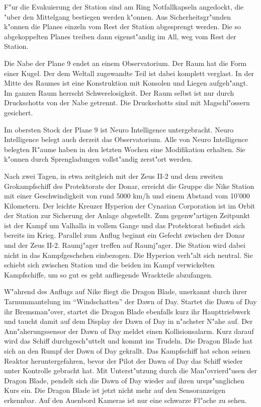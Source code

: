 F"ur die Evakuierung der Station sind am Ring Notfallkapseln angedockt, die "uber den Mittelgang bestiegen werden k"onnen. Aus Sicherheitsgr"unden k"onnen die Planes einzeln vom Rest der Station abgesprengt werden. Die so abgekoppelten Planes treiben dann eigenst"andig im All, weg vom Rest der Station. 

Die Nabe der Plane 9 endet an einem Observatorium. Der Raum hat die Form einer Kugel. Der dem Weltall zugewandte Teil ist dabei komplett verglast. In der Mitte des Raumes ist eine Konstruktion mit Konsolen und Liegen aufgeh"angt. Im ganzen Raum herrscht Schwerelosigkeit. Der Raum selbst ist nur durch Druckschotts von der Nabe getrennt. Die Druckschotts sind mit Magschl"ossern gesichert. 

Im obersten Stock der Plane 9 ist Neuro Intelligence untergebracht. Neuro Intelligence belegt auch derzeit das Observatorium. Alle von Neuro Intelligence belegten R"aume haben in den letzten Wochen eine Modifikation erhalten. Sie k"onnen durch Sprengladungen vollst"andig zerst"ort werden.



Nach zwei Tagen, in etwa zeitgleich mit der Zeus II-2 und dem zweiten Gro\3kampfschiff des Protektorats der Donar, erreicht die Gruppe die Nike Station mit einer Geschwindigkeit von rund 5000 km/h und einem Abstand vom 10'000 Kilometern. Der leichte Kreuzer Hyperion der Cynarian Corporation ist im Orbit der Station zur Sicherung der Anlage abgestellt. Zum gegenw"artigen Zeitpunkt ist der Kampf um Valhalla in vollem Gange und das Protektorat befindet sich bereits im Krieg. Parallel zum Anflug beginnt ein Gefecht zwischen der Donar und der Zeus II-2. Raumj"ager treffen auf Raumj"ager. Die Station wird dabei nicht in das Kampfgeschehen einbezogen. Die Hyperion verh"alt sich neutral. Sie schiebt sich zwischen Station und die beiden im Kampf verwickelten Kampfschiffe, um so gut es geht anfliegende Wrackteile abzufangen.

W"ahrend des Anflugs auf Nike fliegt die Dragon Blade, unerkannt durch ihrer Tarnummantelung im ``Windschatten'' der Dawn of Day. Startet die Dawn of Day ihr Bremsman"over, startet die Dragon Blade ebenfalls kurz ihr Haupttriebwerk und taucht damit auf dem Display der Dawn of Day in n"achster N"ahe auf. Der Ann"aherungssensor der Dawn of Day meldet einen Kollisionsalarm. Kurz darauf wird das Schiff durchgesch"uttelt und kommt ins Trudeln. Die Dragon Blade hat sich an den Rumpf der Dawn of Day gekrallt. Das Kampfschiff hat schon seinen Reaktor heruntergefahren, bevor der Pilot der Dawn of Day das Schiff wieder unter Kontrolle gebracht hat. Mit Unterst"utzung durch die Man"ovrierd"usen der Dragon Blade, pendelt sich die Dawn of Day wieder auf ihren urspr"unglichen Kurs ein. Die Dragon Blade ist jetzt nicht mehr auf den Sensoranzeigen erkennbar. Auf den Au\3enbord Kameras ist nur eine schwarze Fl"ache zu sehen.


